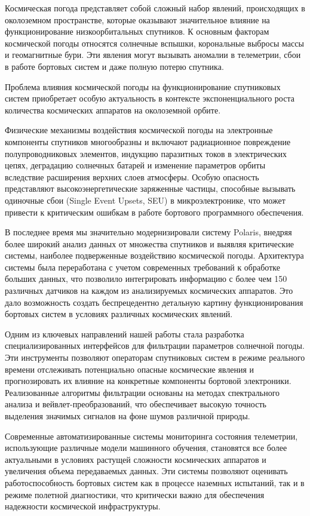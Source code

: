 
Космическая погода представляет собой сложный набор явлений, происходящих в околоземном пространстве, которые оказывают значительное влияние на функционирование низкоорбитальных спутников. К основным факторам космической погоды относятся солнечные вспышки, корональные выбросы массы и геомагнитные бури. Эти явления могут вызывать аномалии в телеметрии, сбои в работе бортовых систем и даже полную потерю спутника.

Проблема влияния космической погоды на функционирование спутниковых систем приобретает особую актуальность в контексте экспоненциального роста количества космических аппаратов на околоземной орбите. 

Физические механизмы воздействия космической погоды на электронные компоненты спутников многообразны и включают радиационное повреждение полупроводниковых элементов, индукцию паразитных токов в электрических цепях, деградацию солнечных батарей и изменение параметров орбиты вследствие расширения верхних слоев атмосферы. Особую опасность представляют высокоэнергетические заряженные частицы, способные вызывать одиночные сбои (Single Event Upsets, SEU) в микроэлектронике, что может привести к критическим ошибкам в работе бортового программного обеспечения.

В последнее время мы значительно модернизировали систему Polaris, внедряя более широкий анализ данных от множества спутников и выявляя критические системы, наиболее подверженные воздействию космической погоды. Архитектура системы была переработана с учетом современных требований к обработке больших данных, что позволило интегрировать информацию с более чем 150 различных датчиков на каждом из анализируемых космических аппаратов. Это дало возможность создать беспрецедентно детальную картину функционирования бортовых систем в условиях различных космических явлений.

Одним из ключевых направлений нашей работы стала разработка специализированных интерфейсов для фильтрации параметров солнечной погоды. Эти инструменты позволяют операторам спутниковых систем в режиме реального времени отслеживать потенциально опасные космические явления и прогнозировать их влияние на конкретные компоненты бортовой электроники. Реализованные алгоритмы фильтрации основаны на методах спектрального анализа и вейвлет-преобразований, что обеспечивает высокую точность выделения значимых сигналов на фоне шумов различной природы.

Современные автоматизированные системы мониторинга состояния телеметрии, использующие различные модели машинного обучения, становятся все более актуальными в условиях растущей сложности космических аппаратов и увеличения объема передаваемых данных. Эти системы позволяют оценивать работоспособность бортовых систем как в процессе наземных испытаний, так и в режиме полетной диагностики, что критически важно для обеспечения надежности космической инфраструктуры.

